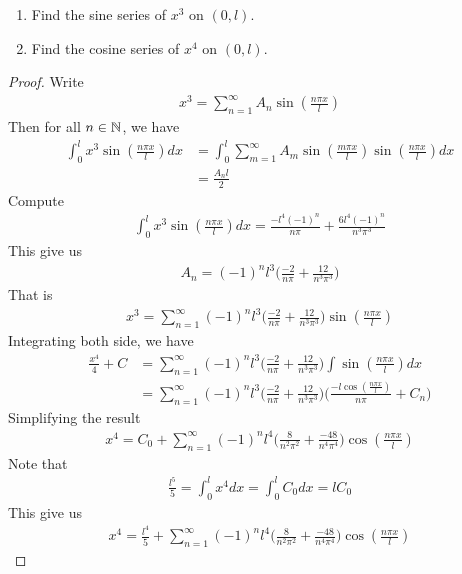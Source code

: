 \documentclass{report}
\begin{document}
\begin{question}{}{}
\begin{enumerate}[label=(\alph*)]
  \item Find the sine series of $x^3$ on  $(0,l)$.
  \item Find the cosine series of $x^4$ on $(0,l)$.
\end{enumerate}
\end{question}
\begin{proof}
Write 
\begin{align*}
x^3 = \sum_{n=1}^{\infty}A_n \sin (\frac{n \pi  x}{l})
\end{align*}
Then for all $n\in\mathbb{N}$, we have 
\begin{align*}
\int_0^l x^3 \sin (\frac{n \pi  x}{l})dx&= \int_0^l \sum_{m=1}^{\infty} A_m \sin (\frac{m \pi  x}{l})\sin (\frac{n \pi  x}{l})dx \\
&= \frac{A_n l}{2}
\end{align*}
Compute 
\begin{align*}
\int_0^l x^3 \sin (\frac{ n \pi  x}{l})dx= \frac{- l^4 (-1)^n}{ n \pi  } + \frac{6l^4 (-1)^n}{n^3 \pi ^3} 
\end{align*}
This give us 
\begin{align*}
A_n= (-1)^nl^3 \Big(\frac{-2}{n \pi }+ \frac{12}{n^3 \pi ^3}\Big)
\end{align*}
That is 
\begin{align*}
x^3= \sum_{n=1}^{\infty} (-1)^n l^3 \Big(\frac{-2}{n \pi  }+ \frac{12}{n^3 \pi ^3} \Big) \sin (\frac{n \pi x }{l})
\end{align*}
Integrating both side, we have 
\begin{align*}
\frac{x^4}{4}+C&= \sum_{n=1}^{\infty} (-1)^n l^3 \Big( \frac{-2}{n\pi }+ \frac{12}{n^3 \pi ^3} \Big) \int  \sin (\frac{n \pi  x}{l})dx \\
&=\sum_{n=1}^{\infty} (-1)^n l^3 \Big( \frac{-2}{n\pi }+ \frac{12}{n^3 \pi ^3} \Big) \Big(\frac{-l\cos (\frac{n \pi  x}{l})}{n \pi }+C_n  \Big)
\end{align*}
Simplifying the result 
\begin{align*}
x^4=C_0 + \sum_{n=1}^{\infty} (-1)^n l^4 \Big( \frac{8}{n^2 \pi ^2}+ \frac{-48}{n^4 \pi ^4} \Big)\cos (\frac{n \pi  x}{l})
\end{align*}
Note that 
\begin{align*}
\frac{l^5}{5}=\int_0^l x^4dx=\int_0^l C_0dx= lC_0
\end{align*}
This give us 
\begin{align*}
x^4= \frac{l^4}{5}+ \sum_{n=1}^{\infty} (-1)^n l^4 \Big( \frac{8}{n^2\pi ^2}+ \frac{-48}{n^4\pi  ^4} \Big) \cos (\frac{n \pi  x}{l})
\end{align*}
\end{proof}
\end{document}
